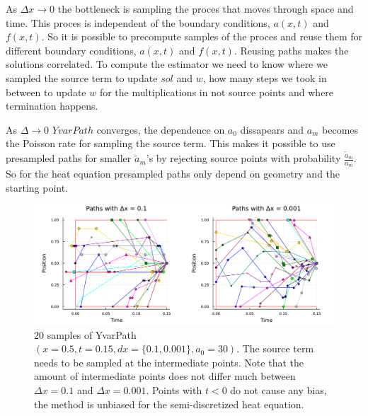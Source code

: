 \documentclass[a4paper,12pt]{article}
\begin{document}
\begin{technique}
  As $\Delta x \rightarrow 0$ the bottleneck is sampling the proces that moves through space and time.
  This proces is independent of the boundary conditions, $a(x,t)$ and $f(x,t)$. So it is possible to
  precompute samples of the proces and reuse them for different boundary conditions, $a(x,t)$ and $f(x,t)$.
  Reusing paths makes the solutions correlated. To compute the estimator we need to know where we sampled the
  source term to update $sol$ and $w$, how many steps we took in between to update $w$ for the
  multiplications in not source points and where termination happens.


  As $\Delta \rightarrow 0$ $YvarPath$ converges, the dependence on $a_{0}$ dissapears and $a_{m}$ becomes the
  Poisson rate for sampling the source term. This makes it possible to use presampled paths for smaller $\tilde{a}_{m}$'s
  by rejecting source points with probability $\frac{\tilde{a}_{m}}{a_{m}}$. So for the heat equation
  presampled paths only depend on geometry and the starting point.

  \begin{figure}[h!]
    \centering
    \includegraphics[width=\textwidth]{./julia_plots/paths_pest_heat_varcoef.pdf}
    \caption{$20$ samples of YvarPath$(x=0.5,t=0.15,dx=\{0.1,0.001\},a_{0}=30)$. The source term needs to be sampled
    at the intermediate points. Note that the amount of
    intermediate points does not differ much between $\Delta x = 0.1$ and $\Delta x = 0.001$.
    Points with $t<0$ do not cause any bias, the method is unbiased for the semi-discretized heat equation. }
    \label{fig:presampled paths pest heat var}
  \end{figure}

\end{technique}
\end{document}
